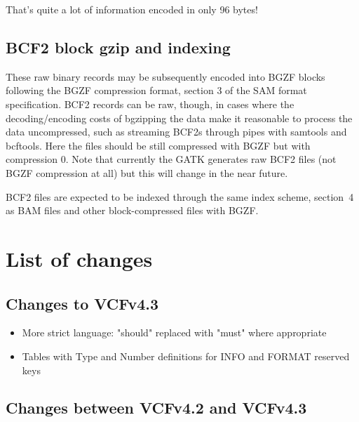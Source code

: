 \documentclass[8pt]{article}
\begin{document}
That's quite a lot of information encoded in only 96 bytes!

\subsection{BCF2 block gzip and indexing}

These raw binary records may be subsequently encoded into BGZF blocks following
the BGZF compression format, section 3 of the SAM format specification.
BCF2 records can be raw, though, in cases where the decoding/encoding costs of
bgzipping the data make it reasonable to process the data uncompressed, such as
streaming BCF2s through pipes with samtools and bcftools.  Here the files
should be still compressed with BGZF but with compression 0.  Note that
currently the GATK generates raw BCF2 files (not BGZF compression at all) but
this will change in the near future.

BCF2 files are expected to be indexed through the same index scheme,
section~4 as BAM files and other block-compressed files with BGZF.

\section{List of changes}

\subsection{Changes to VCFv4.3}

\begin{itemize}
\item More strict language: "should" replaced with "must" where appropriate
\item Tables with Type and Number definitions for INFO and FORMAT reserved keys
\end{itemize}

\subsection{Changes between VCFv4.2 and VCFv4.3}
\end{document}
